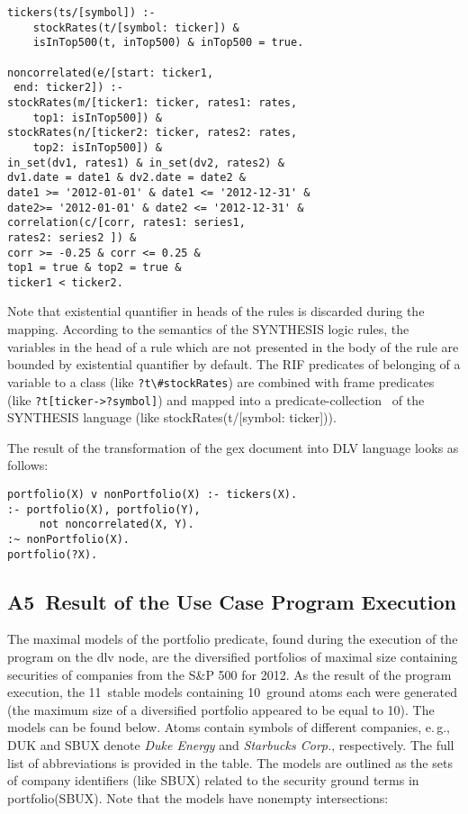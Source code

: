 \begin{multicols}{2}


\noindent
{\small
  \begin{verbatim}
tickers(ts/[symbol]) :- 
    stockRates(t/[symbol: ticker]) &
    isInTop500(t, inTop500) & inTop500 = true.

noncorrelated(e/[start: ticker1, 
 end: ticker2]) :-
stockRates(m/[ticker1: ticker, rates1: rates, 
    top1: isInTop500]) &
stockRates(n/[ticker2: ticker, rates2: rates, 
    top2: isInTop500]) &
in_set(dv1, rates1) & in_set(dv2, rates2) &
dv1.date = date1 & dv2.date = date2 &
date1 >= '2012-01-01' & date1 <= '2012-12-31' &
date2>= '2012-01-01' & date2 <= '2012-12-31' &
correlation(c/[corr, rates1: series1, 
rates2: series2 ]) &
corr >= -0.25 & corr <= 0.25 &
top1 = true & top2 = true &
ticker1 < ticker2.
  \end{verbatim}
}
  


{\small
  Note that existential quantifier in heads of the rules is discarded during the
mapping. According to the semantics of the SYNTHESIS logic rules, the variables in the
head of a rule which are not presented in the body of the rule are bounded by
existential quantifier by default. The RIF predicates of belonging of a variable to a class
(like \verb"?t\#stockRates") are combined with frame predicates (like
  \verb"?t[ticker->?symbol]") and mapped into a predicate-collection~\cite{4-kal} of the
SYNTHESIS language (like {\sf stockRates(t/[symbol: ticker])}).

  The result of the transformation of the {\sf gex} document into DLV language
looks as follows:}

{\small
  \begin{verbatim}
portfolio(X) v nonPortfolio(X) :- tickers(X).
:- portfolio(X), portfolio(Y),
     not noncorrelated(X, Y).
:~ nonPortfolio(X).
portfolio(?X).
  \end{verbatim}
}  

{\small
\subsection*{A5\ Result of the Use Case Program Execution}


\noindent
The maximal models of the {\sf portfolio} predicate, found during the execution of
the program on the {\sf dlv} node, are the diversified portfolios of maximal size
containing securities of companies from the S\&P 500 for 2012. As the result of the
program execution, the 11~stable models containing 10~ground atoms each were
generated (the maximum size of a diversified portfolio appeared to be equal to 10).
The models can be found below. Atoms contain symbols of different companies,
e.\,g., DUK and SBUX denote \textit{Duke Energy} and \textit{Starbucks Corp.},
respectively. The full list of abbreviations is provided in the table. The
models are outlined as the sets of company identifiers (like SBUX) related to the security ground terms
in {\sf portfolio(SBUX)}. Note that the models have nonempty intersections:



}
\end{multicols}

